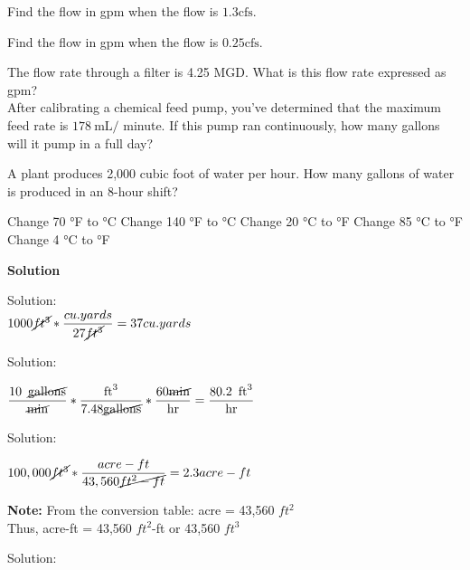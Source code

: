 Find the flow in gpm when the flow is $1.3 \mathrm{cfs}$.

Find the flow in gpm when the flow is $0.25 \mathrm{cfs}$.

The flow rate through a filter is 4.25 MGD. What is this flow rate expressed as gpm?\\

After calibrating a chemical feed pump, you've determined that the maximum feed rate is $178 \mathrm{~mL} /$ minute. If this pump ran continuously, how many gallons will it pump in a full day?

A plant produces 2,000 cubic foot of water per hour. How many gallons of water is produced in an 8-hour shift?

Change 70 °F to °C
Change 140 °F to °C
Change 20 °C to °F
Change 85 °C to °F
Change 4 °C to °F

\textbf{Solution}

Solution:\\

$1000 \cancel{ft^3}*\dfrac{cu.yards}{27\cancel{ft^3}} = 37 cu.yards$

Solution:\\

\vspace{0.4cm}

$\dfrac{10 \enspace \cancel{\mathrm{gallons}}}{\cancel{\mathrm{min}}}*  \dfrac{\mathrm{ft}^3}{7.48 \cancel{\mathrm{gallons}}}  * \dfrac{60 \cancel{\mathrm{min}}}{\mathrm{hr}}   = \dfrac{80.2 \enspace \mathrm{ft}^3}{\mathrm{hr}}$

\vspace{0.4cm}


Solution:\\

\vspace{0.4cm}

$100,000 \cancel{ft^3} * \dfrac{acre-ft}{43,560 \cancel{ft^2-ft}} =  2.3 acre-ft$\\

\vspace{0.2cm}

\textbf{Note:} From the conversion table: acre = 43,560 $ft^2$\\
Thus, acre-ft  = 43,560 $ft^2$-ft or 43,560 $ft^3$\\

\vspace{0.4cm}

Solution:\\

\vspace{0.4cm}

